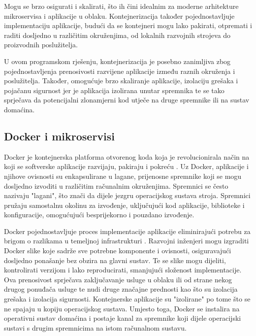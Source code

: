 \documentclass[times, utf8, diplomski]{fer}
\begin{document}
Mogu se brzo osigurati i skalirati, što ih čini idealnim za moderne arhitekture mikroservisa i aplikacije u oblaku. Kontejnerizacija također pojednostavljuje implementaciju aplikacije, budući da se kontejneri mogu lako pakirati, otpremati i raditi dosljedno u različitim okruženjima, od lokalnih razvojnih strojeva do proizvodnih poslužitelja. 

U ovom programskom rješenju, kontejnerizacija je posebno zanimljiva zbog pojednostavljenja prenosivosti razvijene aplikacije između raznih okruženja i poslužitelja. Također, omogućuje brzo skaliranje aplikacije, izolaciju grešaka i pojačanu sigurnost jer je aplikacija izolirana unutar spremnika te se tako sprječava da potencijalni zlonamjerni kod utječe na druge spremnike ili na sustav domaćina.

\subsection{Docker i mikroservisi}

Docker je kontejnerska platforma otvorenog koda koja je revolucionirala način na koji se softverske aplikacije razvijaju, pakiraju i pokreću \cite{docker2020docker}. Uz Docker, aplikacije i njihove ovisnosti su enkapsulirane u lagane, prijenosne spremnike koji se mogu dosljedno izvoditi u različitim računalnim okruženjima. Spremnici se često nazivaju "lagani", što znači da dijele jezgru operacijskog sustava stroja. Spremnici pružaju samostalnu okolinu za izvođenje, uključujući kod aplikacije, biblioteke i konfiguracije, omogućujući besprijekorno i pouzdano izvođenje. 

Docker pojednostavljuje proces implementacije aplikacije eliminirajući potrebu za brigom o razlikama u temeljnoj infrastrukturi \cite{docker2020docker}. Razvojni inženjeri mogu izgraditi Docker slike koje sadrže sve potrebne komponente i ovisnosti, osiguravajući dosljedno ponašanje bez obzira na glavni sustav. Te se slike mogu dijeliti, kontrolirati verzijom i lako reproducirati, smanjujući složenost implementacije. Ova prenosivost sprječava zaključavanje usluge u oblaku ili od strane nekog drugog ponuđača usluge te nudi druge značajne prednosti kao što su izolacija grešaka i izolacija sigurnosti. Kontejnerske aplikacije su "izolirane" po tome što se ne spajaju u kopiju operacijskog sustava. Umjesto toga, Docker se instalira na operativni sustav domaćina i postaje kanal za spremnike koji dijele operacijski sustavi s drugim spremnicima na istom računalnom sustavu.
\end{document}
